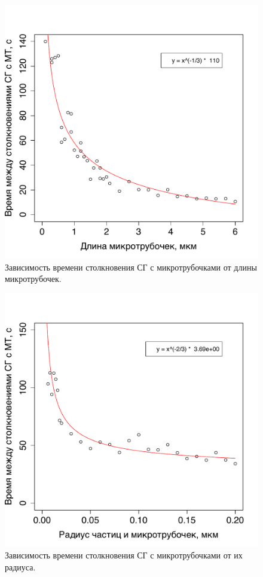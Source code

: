 \documentclass[14pt,a4paper]{extarticle}
\begin{document}
\begin{figure}[htbp]\centering
\includegraphics[width=0.9\columnwidth]{../results/P2mCollisionTimeOnLengthExperiment.pdf}
\caption{Зависимость времени столкновения СГ с микротрубочками от длины микротрубочек.}
\label{fig:P2mCollisionTimeOnLengthExperiment}
\end{figure}

\begin{figure}[htbp]\centering
\includegraphics[width=0.9\columnwidth]{../results/P2mCollisionTimeOnRadiusExperiment.pdf}
\caption{Зависимость времени столкновения СГ с микротрубочками от их радиуса.}
\label{fig:P2mCollisionTimeOnRadiusExperiment}
\end{figure}
\end{document}
